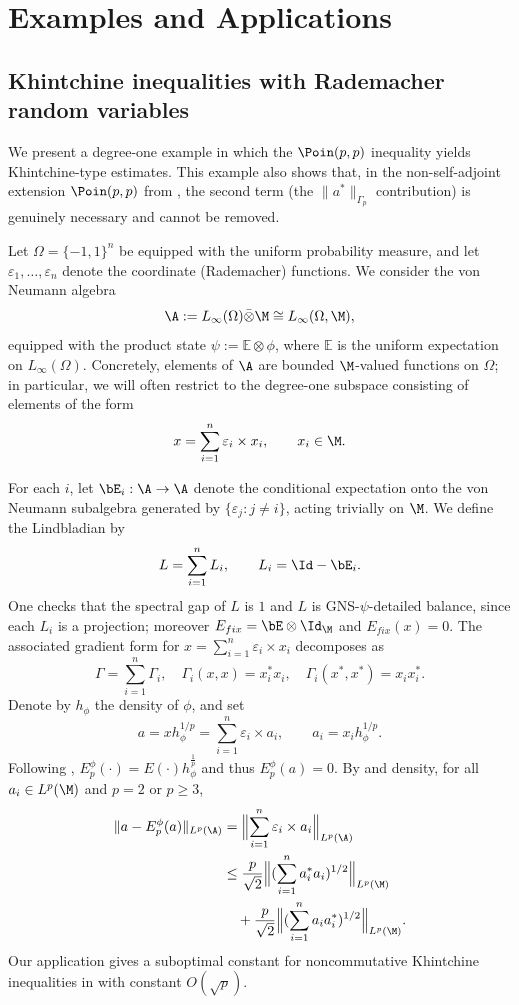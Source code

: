 \documentclass[sn-mathphys-num]{sn-jnl}
\begin{document}
\section{Examples and Applications}\label{sec:examples}


\subsection{Khintchine inequalities with Rademacher random variables}
We present a degree-one example in which the $\Poin(p,p)$ inequality yields
Khintchine-type estimates. This example also shows that, in the non-self-adjoint
extension $\Poin(p,p)$ from , the second term
(the $\|a^*\|_{\Gamma_p}$ contribution) is genuinely necessary and cannot be removed.

Let $\Omega=\{-1,1\}^n$ be equipped with the uniform probability measure, and let
$\varepsilon_1,\dots,\varepsilon_n$ denote the coordinate (Rademacher) functions.
We consider the von Neumann algebra
\[
\A := L_\infty(\Omega) \bar\otimes \M  \cong  L_\infty(\Omega,\M),
\]
equipped with the product state $\psi:=\mathbb E\otimes\phi$, where $\mathbb E$ is the uniform
expectation on $L_\infty(\Omega)$. Concretely, elements of $\A$ are bounded
$\M$-valued functions on $\Omega$; in particular, we will often restrict to the
degree-one subspace consisting of elements of the form
\[
x=\sum_{i=1}^n \varepsilon_i \times x_i,\qquad x_i\in\M.
\]

For each $i$, let $\bE_i:\A\to\A$ denote the conditional expectation onto the
von Neumann subalgebra generated by $\{\varepsilon_j:j\neq i\}$, acting trivially
on $\M$. We define the Lindbladian by
\[
    L=\sum_{i=1}^n L_i,\qquad L_i=\Id-\bE_i.
\]
One checks that the spectral gap of $L$ is $1$ and $L$ is GNS-$\psi$-detailed balance, since each $L_i$ is a projection; moreover $E_{fix}=\bE\otimes\Id_\M$ and $E_{fix}(x)=0$.
The associated gradient form for $x=\sum_{i=1}^n \varepsilon_i\times x_i$  decomposes as
\[
\Gamma=\sum_{i=1}^n \Gamma_i,\quad
\Gamma_i(x,x)= x_i^*x_i,
\quad
\Gamma_i(x^*,x^*)= x_i x_i^*.
\]
Denote by $h_\phi$ the density of $\phi$, and set
\[
a=xh_\phi^{1/p}=\sum_{i=1}^n \varepsilon_i\times a_i,
\qquad a_i=x_i h_\phi^{1/p}.
\]
Following , $E_p^\phi(\cdot)=E(\cdot)h_{\phi}^{\frac 1p}$ and thus $E_p^\phi(a)=0$. By  and density, for all $a_i\in L^p(\M)$ and $p=2$ or $p\ge3$,
\[
\begin{aligned}
\|a-E_p^\phi(a)\|_{L^p(\A)}
&=\Bigl\|\sum_{i=1}^n \varepsilon_i\times a_i\Bigr\|_{L^p(\A)} \\
&\le
\frac{p}{\sqrt{2}}
\Bigl\|(\sum_{i=1}^n a_i^*a_i)^{1/2}\Bigr\|_{L^p(\M)} \\
&\quad+
\frac{p}{\sqrt{2}}
\Bigl\|(\sum_{i=1}^n a_i a_i^*)^{1/2}\Bigr\|_{L^p(\M)}.
\end{aligned}
\]
Our application gives a suboptimal constant for noncommutative Khintchine inequalities in \cite{Lust-Piquard_Pisier_1991} with constant $O(\sqrt{p})$.
\end{document}
